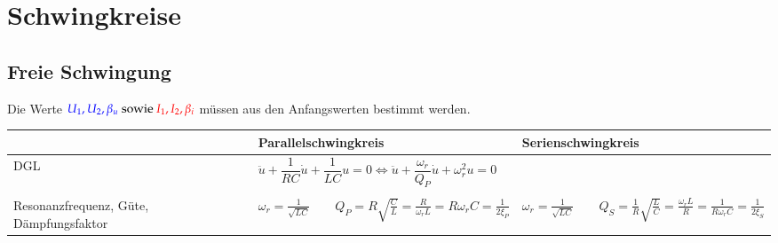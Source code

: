 \section{Schwingkreise}
\subsection{Freie Schwingung}
Die Werte $\textcolor{blue}{U_1,U_2,\beta_u}\text{ sowie
}\textcolor{red}{I_1,I_2,\beta_i}$ müssen aus den Anfangswerten bestimmt
werden.\\
\renewcommand{\arraystretch}{1.5}
\begin{tabular}{| p{4cm} | p{7cm} | p{7cm} |}
	\hline
		& \textbf{Parallelschwingkreis} 
		& \textbf{Serienschwingkreis} \\
	\hline
	DGL &
	\begin{minipage}{7cm}
    	\vspace{0.1cm}
    	$\ddot{u} + \dfrac{1}{RC} \dot{u} + \dfrac{1}{LC} u = 0
    	\Leftrightarrow \ddot{u} + \dfrac{\omega_r}{Q_P} \dot{u} + \omega_r^2
    	u = 0$
    \end{minipage}& 
	\begin{minipage}{7cm}
    	\vspace{0.1cm}
    	$\ddot{i} + \dfrac{R}{L} \dot{i} + \dfrac{1}{LC} i = 0
    	\Leftrightarrow \ddot{i} + \dfrac{\omega_r}{Q_S} \dot{i} + \omega_r^2 i =
    	0$\\
    \end{minipage}\\
	\hline
	Resonanzfrequenz, Güte, Dämpfungsfaktor &
		\begin{minipage}{7cm}
        	\vspace{0.1cm}
       		$\omega_r = \frac{1}{\sqrt{LC}}\qquad Q_P = R\sqrt{\frac{C}{L}} =
       		\frac{R}{\omega_r L}=R\omega_rC =\frac{1}{2 \xi_P}$
       		\end{minipage}&
		\begin{minipage}{7cm}
        	\vspace{0.1cm}
	  		$\omega_r = \frac{1}{\sqrt{LC}}\qquad Q_S = \frac{1}{R}\sqrt{\frac{L}{C}}
	  		= \frac{\omega_r L}{R}=\frac{1}{R\omega_rC} = \frac{1}{2 \xi_S}$
	  		\end{minipage}\\


\end{tabular}
